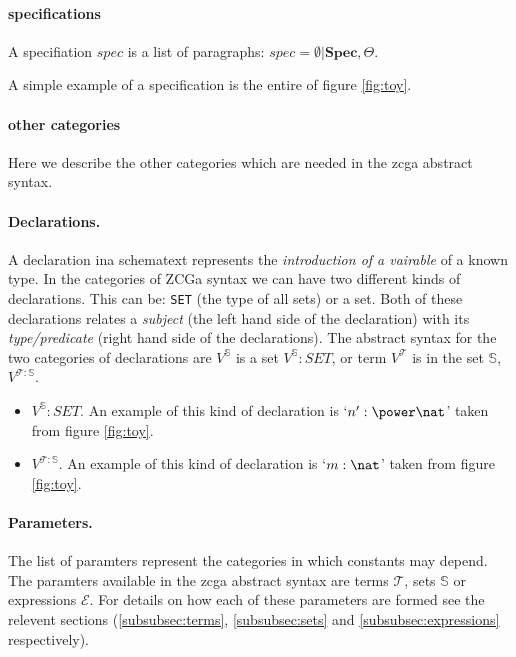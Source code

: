 \paragraph{specifications}
A specifiation $spec$ is a list of paragraphs: $spec= \emptyset \vert
\mathbf{Spec}, \Theta$.

A simple example of a specification is the entire of figure \ref{fig:toy}.

\paragraph{other categories}

Here we describe the other categories which are needed in the \gls{zcga}
abstract syntax.

\paragraph{Declarations.} A declaration ina schematext represents the
\emph{introduction of a vairable} of a known type. In the categories of ZCGa
syntax we can have two different kinds of declarations. This can be:
\texttt{SET} (the type of all sets) or a set. Both of these declarations relates
a \emph{subject} (the left hand side of the declaration) with its
\emph{type/predicate} (right hand side of the declarations). The abstract syntax
for the two categories of declarations are $V^{\mathbb{S}}$ is a set
$V^{\mathbb{S}}:SET$, or term $V^{\mathcal{T}}$ is in the set $\mathbb{S}$,
$V^{\mathcal{T}:\mathbb{S}}$.

\begin{itemize}
\item$V^{\mathbb{S}}:SET$. An example of this kind of declaration is `$n':\power
\nat$' taken from figure \ref{fig:toy}.

\item $V^{\mathcal{T}:\mathbb{S}}$. An example of this kind of declaration is
`$m:\nat$' taken from figure \ref{fig:toy}.
\end{itemize}

\paragraph{Parameters.} The list of paramters represent the categories in which
constants may depend. The paramters available in the \gls{zcga} abstract syntax
are terms $\mathcal{T}$, sets $\mathbb{S}$ or expressions $\mathcal{E}$. For
details on how each of these parameters are formed see the relevent sections
(\ref{subsubsec:terms}, \ref{subsubsec:sets} and \ref{subsubsec:expressions}
respectively).

